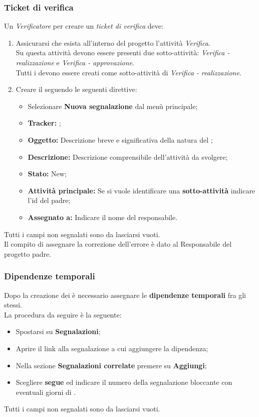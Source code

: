       \subsubsection{Ticket di verifica}
        Un \emph{Verificatore} per creare un \emph{ticket di verifica} deve:
        \begin{enumerate}
          \item Assicurarsi che esista all'interno del progetto l'attività \emph{Verifica}.\\
          Su questa attività devono essere presenti due sotto-attività: \emph{Verifica - realizzazione} e \emph{Verifica - approvazione}.\\
          Tutti i  devono essere creati come sotto-attività di \emph{Verifica - realizzazione}.
          \item Creare il  seguendo le seguenti direttive:
          \bgroup
            \begin{itemize}
              \item Selezionare \textbf{Nuova segnalazione} dal menù principale;
              \item \textbf{Tracker: };
              \item \textbf{Oggetto: }Descrizione breve e significativa della natura del ;
              \item \textbf{Descrizione: }Descrizione comprensibile dell'attività da svolgere;
              \item \textbf{Stato: }New;
              \item \textbf{Attività principale: }Se si vuole identificare una \textbf{sotto-attività} indicare l'id del  padre;
              \item \textbf{Assegnato a: }Indicare il nome del responsabile.
            \end{itemize}
          \egroup
        \end{enumerate}
      Tutti i campi non segnalati sono da lasciarsi vuoti.\\
      Il compito di assegnare la correzione dell'errore è dato al Responsabile del progetto padre.
    \subsubsection{Dipendenze temporali}
      Dopo la creazione dei  è necessario assegnare le \textbf{dipendenze temporali} fra gli stessi.\\
      La procedura da seguire è la seguente:
      \begin{itemize}
        \item Spostarsi su \textbf{Segnalazioni};
        \item Aprire il link alla segnalazione a cui aggiungere la dipendenza;
        \item Nella sezione \textbf{Segnalazioni correlate} premere su \textbf{Aggiungi};
        \item Scegliere \textbf{segue} ed indicare il numero della segnalazione bloccante con eventuali giorni di .
      \end{itemize}
      Tutti i campi non segnalati sono da lasciarsi vuoti.
